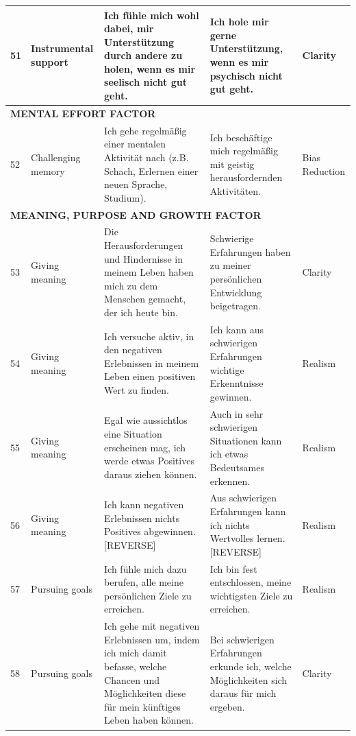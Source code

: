 \documentclass[12pt,a4paper]{article}
\begin{document}
\begin{longtable}{p{}p{}p{}p{}p{}}
51 & Instrumental support & Ich fühle mich wohl dabei, mir Unterstützung durch andere zu holen, wenn es mir seelisch nicht gut geht. & Ich hole mir gerne Unterstützung, wenn es mir psychisch nicht gut geht. & Clarity \\

\midrule
\multicolumn{5}{l}{\textbf{MENTAL EFFORT FACTOR}} \\
\midrule

52 & Challenging memory & Ich gehe regelmäßig einer mentalen Aktivität nach (z.B. Schach, Erlernen einer neuen Sprache, Studium). & Ich beschäftige mich regelmäßig mit geistig herausfordernden Aktivitäten. & Bias Reduction \\

\midrule
\multicolumn{5}{l}{\textbf{MEANING, PURPOSE AND GROWTH FACTOR}} \\
\midrule

53 & Giving meaning & Die Herausforderungen und Hindernisse in meinem Leben haben mich zu dem Menschen gemacht, der ich heute bin. & Schwierige Erfahrungen haben zu meiner persönlichen Entwicklung beigetragen. & Clarity \\

54 & Giving meaning & Ich versuche aktiv, in den negativen Erlebnissen in meinem Leben einen positiven Wert zu finden. & Ich kann aus schwierigen Erfahrungen wichtige Erkenntnisse gewinnen. & Realism \\

55 & Giving meaning & Egal wie aussichtlos eine Situation erscheinen mag, ich werde etwas Positives daraus ziehen können. & Auch in sehr schwierigen Situationen kann ich etwas Bedeutsames erkennen. & Realism \\

56 & Giving meaning & Ich kann negativen Erlebnissen nichts Positives abgewinnen. [REVERSE] & Aus schwierigen Erfahrungen kann ich nichts Wertvolles lernen. [REVERSE] & Realism \\

57 & Pursuing goals & Ich fühle mich dazu berufen, alle meine persönlichen Ziele zu erreichen. & Ich bin fest entschlossen, meine wichtigsten Ziele zu erreichen. & Realism \\

58 & Pursuing goals & Ich gehe mit negativen Erlebnissen um, indem ich mich damit befasse, welche Chancen und Möglichkeiten diese für mein künftiges Leben haben können. & Bei schwierigen Erfahrungen erkunde ich, welche Möglichkeiten sich daraus für mich ergeben. & Clarity \\


\end{longtable}
\end{document}
